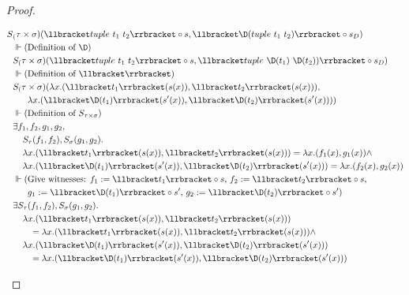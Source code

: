 \begin{proof}
\begin{enumerate}
      \begin{align*}
        S&_(\tau \times \sigma)(\llbracket tuple\ t_1\ t_2 \rrbracket \circ s, \llbracket \D(tuple\ t_1\ t_2) \rrbracket \circ s_D) \\
        & \Vdash \text{(Definition of $\D$)} \\
        & S_(\tau \times \sigma)(\llbracket tuple\ t_1\ t_2 \rrbracket \circ s, \llbracket tuple\ \D(t_1)\ \D(t_2)) \rrbracket \circ s_D) \\
        & \Vdash \text{(Definition of $\llbracket\rrbracket$)} \\
        & S_(\tau \times \sigma)(\lambda x. (\llbracket t_1 \rrbracket(s(x)), \llbracket t_2 \rrbracket(s(x))), \\
        & \;\;\;\;\;\;\lambda x. (\llbracket \D(t_1) \rrbracket(s'(x)), \llbracket \D(t_2) \rrbracket(s'(x)))) \\
        & \Vdash \text{(Definition of $S_{\tau\times\sigma}$)} \\
        & \exists f_1, f_2, g_1, g_2, \\
            & \;\;\;\;S_\tau(f_1, f_2), S_\sigma(g_1, g_2). \\
            & \;\;\;\;\lambda x. (\llbracket t_1 \rrbracket(s(x)), \llbracket t_2 \rrbracket(s(x))) = \lambda x. (f_1(x), g_1(x)) \wedge \\
            & \;\;\;\;\lambda x. (\llbracket \D(t_1) \rrbracket(s'(x)), \llbracket \D(t_2) \rrbracket(s'(x))) = \lambda x. (f_2(x), g_2(x)) \\
        & \Vdash \text{(Give witnesses: $f_1 := \llbracket t_1 \rrbracket \circ s$, $f_2 := \llbracket t_2 \rrbracket \circ s$,} \\
        & \;\;\;\;\;\; \text{$g_1 := \llbracket \D(t_1) \rrbracket \circ s'$, $g_2 := \llbracket \D(t_2) \rrbracket \circ s'$)} \\
        & \exists S_\tau(f_1, f_2), S_\sigma(g_1, g_2). \\
          & \;\;\;\;\lambda x. (\llbracket t_1 \rrbracket(s(x)), \llbracket t_2 \rrbracket(s(x))) \\
          & \;\;\;\;\;\;\; = \lambda x. (\llbracket t_1 \rrbracket(s(x)), \llbracket t_2 \rrbracket(s(x))) \wedge \\
          & \;\;\;\;\lambda x. (\llbracket \D(t_1) \rrbracket(s'(x)), \llbracket \D(t_2) \rrbracket(s'(x))) \\
          & \;\;\;\;\;\;\; = \lambda x. (\llbracket \D(t_1) \rrbracket(s'(x)), \llbracket \D(t_2) \rrbracket(s'(x))) \\

\end{align*}
\end{enumerate}
\end{proof}

